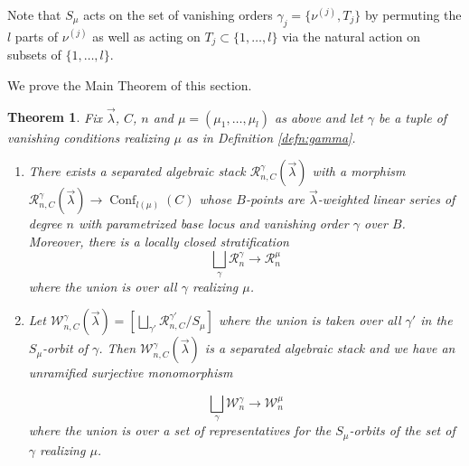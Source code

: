 \documentclass[a4paper,12pt]{amsart}
\newtheorem{thm}{Theorem}[section]
\theoremstyle{definition}
\newcommand{\cW}{\mathcal{W}}
\newcommand{\cR}{\mathcal{R}}
\DeclareMathOperator{\Conf}{Conf}
\newcommand{\lambdavec}{{\vec{\lambda}}}
\begin{document}
	
	Note that $S_\mu$ acts on the set of vanishing orders $\gamma_j = \{\nu^{(j)}, T_j\}$ by permuting the $l$ parts of $\nu^{(j)}$ as well as acting on $T_j \subset \{1, \ldots, l\}$ via the natural action on subsets of $\{1, \ldots, l\}$. 
	
	We prove the Main Theorem of this section.
	
	\begin{thm}\label{thm:main-thm-of-sec4} Fix $\lambdavec$, $C$, $n$ and $\mu = (\mu_1, \ldots, \mu_l)$ as above and let $\gamma$ be a tuple of vanishing conditions realizing $\mu$ as in Definition \ref{defn:gamma}. 
		\begin{enumerate}[(1)]
			\item There exists a separated algebraic stack $\cR^\gamma_{n,C}(\lambdavec)$ with a morphism $\cR^\gamma_{n,C}(\lambdavec) \to \Conf_{l(\mu)}(C)$ whose $B$-points are $\lambdavec$-weighted linear series of degree $n$ with parametrized base locus and vanishing order $\gamma$ over $B$. Moreover, there is a locally closed stratification
			$$
			\bigsqcup_{\gamma} \cR^\gamma_n \to \cR^\mu_n
			$$
			where the union is over all $\gamma$ realizing $\mu$.
			
			\item Let $\cW^\gamma_{n,C}({\lambdavec})=\left[\bigsqcup_{\gamma'}\cR^{\gamma'}_{n,C}/S_\mu\right]$ where the union is taken over all $\gamma'$ in the $S_\mu$-orbit of $\gamma$. Then $\cW^\gamma_{n,C}({\lambdavec})$ is a
			separated algebraic stack and we have an unramified surjective monomorphism
			
			$$
			\bigsqcup_\gamma \cW^\gamma_n \to \cW^\mu_n
			$$
			where the union is over a set of representatives for the $S_\mu$-orbits of the set of $\gamma$ realizing $\mu$.
		\end{enumerate}
	\end{thm}
	
	
	
	
	
\end{document}
